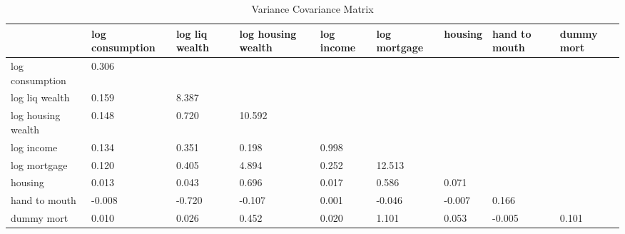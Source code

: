 \begin{table}[htbp]
\caption{\label{clabel} Variance Covariance Matrix}\centering\medskip
\begin{tabular}{lllllllll} \hline \hline
 & log consumption  & log liq wealth  & log housing wealth  & log income  & log mortgage  & housing  & hand to mouth  & dummy mort  \\  \hline 
log consumption &     0.306 \\  
log liq wealth &     0.159 &     8.387 \\  
log housing wealth &     0.148 &     0.720 &    10.592 \\  
log income &     0.134 &     0.351 &     0.198 &     0.998 \\  
log mortgage &     0.120 &     0.405 &     4.894 &     0.252 &    12.513 \\  
housing &     0.013 &     0.043 &     0.696 &     0.017 &     0.586 &     0.071 \\  
hand to mouth &    -0.008 &    -0.720 &    -0.107 &     0.001 &    -0.046 &    -0.007 &     0.166 \\  
dummy mort &     0.010 &     0.026 &     0.452 &     0.020 &     1.101 &     0.053 &    -0.005 &     0.101 \\  
\hline \hline \end{tabular}
\end{table}

